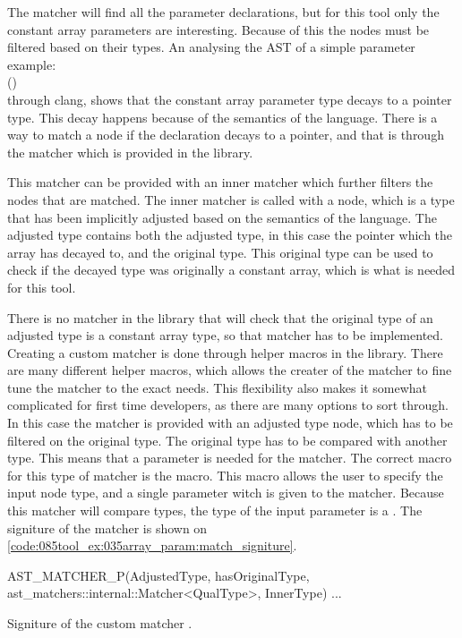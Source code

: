 The  matcher will find all the parameter declarations, but for this tool only the constant array parameters are interesting. Because of this the nodes must be filtered based on their types. An analysing the AST of a simple parameter example:\\ ()\\
through clang, shows that the constant array parameter type decays to a pointer type. This decay happens because of the semantics of the language. There is a way to match a node if the declaration decays to a pointer, and that is through the  matcher which is provided in the library.

This matcher can be provided with an inner matcher which further filters the nodes that are matched. The inner matcher is called with a  node, which is a type that has been implicitly adjusted based on the semantics of the language. The adjusted type contains both the adjusted type, in this case the pointer which the array has decayed to, and the original type. This original type can be used to check if the decayed type was originally a constant array, which is what is needed for this tool. 

There is no matcher in the library that will check that the original type of an adjusted type is a constant array type, so that matcher has to be implemented. Creating a custom matcher is done through helper macros in the library. There are many different helper macros, which allows the creater of the matcher to fine tune the matcher to the exact needs. This flexibility also makes it somewhat complicated for first time developers, as there are many options to sort through. In this case the matcher is provided with an adjusted type node, which has to be filtered on the original type. The original type has to be compared with another type. This means that a parameter is needed for the matcher. The correct macro for this type of matcher is the  macro. This macro allows the user to specify the input node type, and a single parameter witch is given to the matcher. Because this matcher will compare types, the type of the input parameter is a . The signiture of the matcher is shown on \cref{code:085tool_ex:035array_param:match_signiture}.

\begin{listing}[H]
    \begin{cppcode}
AST_MATCHER_P(AdjustedType, hasOriginalType,
                  ast_matchers::internal::Matcher<QualType>, InnerType) {
    ...
}
    \end{cppcode}
    \caption{Signiture of the custom matcher .}
    \label{code:085tool_ex:035array_param:match_signiture}
\end{listing}

